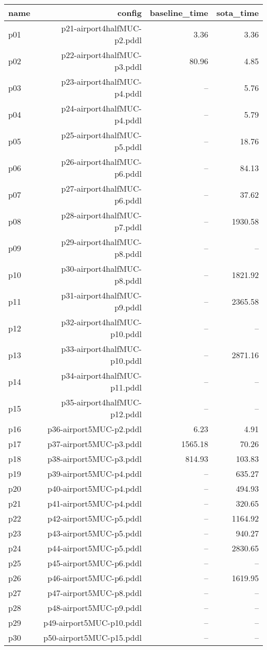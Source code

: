 \documentclass{article}
\begin{document}
                            \begin{center}
                            \scriptsize
                            \begin{tabular}{@{}l|r|r|r@{}}
                            name & config & baseline\_time & sota\_time\\\midrule
                              p01& p21-airport4halfMUC-p2.pddl&3.36&3.36\\
  p02& p22-airport4halfMUC-p3.pddl&80.96&4.85\\
  p03& p23-airport4halfMUC-p4.pddl&--&5.76\\
  p04& p24-airport4halfMUC-p4.pddl&--&5.79\\
  p05& p25-airport4halfMUC-p5.pddl&--&18.76\\
  p06& p26-airport4halfMUC-p6.pddl&--&84.13\\
  p07& p27-airport4halfMUC-p6.pddl&--&37.62\\
  p08& p28-airport4halfMUC-p7.pddl&--&1930.58\\
  p09& p29-airport4halfMUC-p8.pddl&--&--\\
  p10& p30-airport4halfMUC-p8.pddl&--&1821.92\\
  p11& p31-airport4halfMUC-p9.pddl&--&2365.58\\
  p12& p32-airport4halfMUC-p10.pddl&--&--\\
  p13& p33-airport4halfMUC-p10.pddl&--&2871.16\\
  p14& p34-airport4halfMUC-p11.pddl&--&--\\
  p15& p35-airport4halfMUC-p12.pddl&--&--\\
  p16& p36-airport5MUC-p2.pddl&6.23&4.91\\
  p17& p37-airport5MUC-p3.pddl&1565.18&70.26\\
  p18& p38-airport5MUC-p3.pddl&814.93&103.83\\
  p19& p39-airport5MUC-p4.pddl&--&635.27\\
  p20& p40-airport5MUC-p4.pddl&--&494.93\\
  p21& p41-airport5MUC-p4.pddl&--&320.65\\
  p22& p42-airport5MUC-p5.pddl&--&1164.92\\
  p23& p43-airport5MUC-p5.pddl&--&940.27\\
  p24& p44-airport5MUC-p5.pddl&--&2830.65\\
  p25& p45-airport5MUC-p6.pddl&--&--\\
  p26& p46-airport5MUC-p6.pddl&--&1619.95\\
  p27& p47-airport5MUC-p8.pddl&--&--\\
  p28& p48-airport5MUC-p9.pddl&--&--\\
  p29& p49-airport5MUC-p10.pddl&--&--\\
  p30& p50-airport5MUC-p15.pddl&--&--
                            \end{tabular}
                            \end{center}
                    
\end{document}
